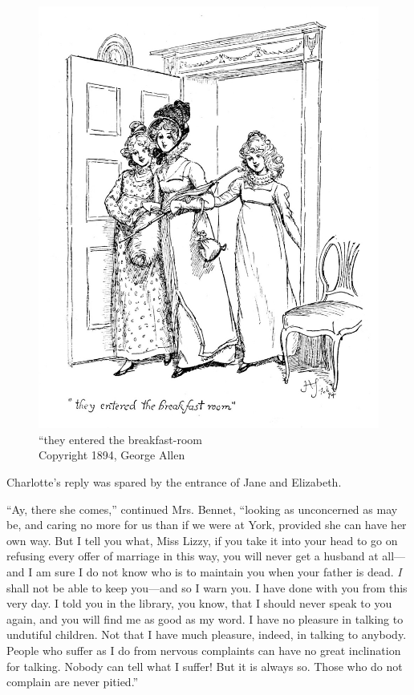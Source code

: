 \begin{figure}[htbp]
    \centering
    \includegraphics[width=\textwidth]{illustrations/i_172.jpg}
    \caption{“they entered the breakfast-room\\ Copyright 1894, George Allen}
    \label{fig:image}
\end{figure}


Charlotte's reply was spared by the entrance of Jane and Elizabeth.

``Ay, there she comes,'' continued Mrs. Bennet, ``looking as unconcerned as may be, and caring no more for us than if we were at York, provided she can have her own way. But I tell you what, Miss Lizzy, if you take it into your head to go on refusing every offer of marriage in this way, you will never get a husband at all---and I am sure I do not know who is to maintain you when your father is dead. \textit{I} shall not be able to keep you---and so I warn you. I have done with you from this very day. I told you in the library, you know, that I should never speak to you again, and you will find me as good as my word. I have no pleasure in talking to undutiful children. Not that I have much pleasure, indeed, in talking to anybody. People who suffer as I do from nervous complaints can have no great inclination for talking. Nobody can tell what I suffer! But it is always so. Those who do not complain are never pitied.''

